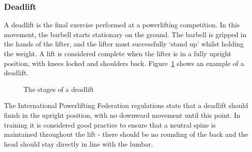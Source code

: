\subsubsection{Deadlift}

A deadlift is the final exercise performed at a powerlifting competition. In this movement, the barbell starts stationary on the ground. The barbell is gripped in the hands of the lifter, and the lifter must successfully ‘stand up’ whilst holding the weight. A lift is considered complete when the lifter is in a fully upright position, with knees locked and shoulders back. Figure~\ref{fig:dead_stages} shows an example of a deadlift.

\begin{figure}[H]
    \centering
\caption{The stages of a deadlift}
\label{fig:dead_stages}
\end{figure}

The International Powerlifting Federation regulations\cite{ipf} state that a deadlift should finish in the upright position, with no downward movement until this point. In training it is considered good practice to ensure that a neutral spine is maintained throughout the lift - there should be no rounding of the back and the head should stay directly in line with the lumbar.